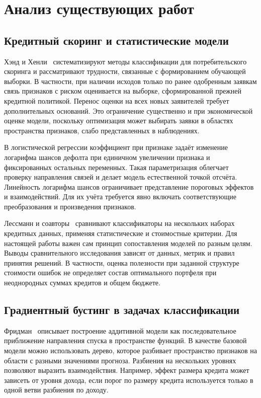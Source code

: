 \documentclass{misisarticle}
\begin{document}
\section{Анализ существующих работ}

\subsection{Кредитный скоринг и статистические модели}

Хэнд и Хенли~\cite{hand} систематизируют методы классификации для потребительского скоринга и рассматривают трудности, связанные с формированием обучающей выборки. В частности, при наличии исходов только по ранее одобренным заявкам связь признаков с риском оценивается на выборке, сформированной прежней кредитной политикой. Перенос оценки на всех новых заявителей требует дополнительных оснований. Это ограничение существенно и при экономической оценке модели, поскольку оптимизация может выбирать заявки в областях пространства признаков, слабо представленных в наблюдениях.

В логистической регрессии коэффициент при признаке задаёт изменение логарифма шансов дефолта при единичном увеличении признака и фиксированных остальных переменных. Такая параметризация облегчает проверку направления связей и делает модель естественной точкой отсчёта. Линейность логарифма шансов ограничивает представление пороговых эффектов и взаимодействий. Для их учёта требуется явно включать соответствующие преобразования и произведения признаков.

Лессманн и соавторы~\cite{lessmann} сравнивают классификаторы на нескольких наборах кредитных данных, применяя статистические и стоимостные критерии. Для настоящей работы важен сам принцип сопоставления моделей по разным целям. Выводы сравнительного исследования зависят от данных, метрик и правил принятия решений. В частности, оценка полезности при заданной структуре стоимости ошибок не определяет состав оптимального портфеля при неоднородных суммах кредитов и общем бюджете.

\subsection{Градиентный бустинг в задачах классификации}

Фридман~\cite{friedman} описывает построение аддитивной модели как последовательное приближение направления спуска в пространстве функций. В качестве базовой модели можно использовать дерево, которое разбивает пространство признаков на области с разными значениями прогноза. Разбиения на нескольких уровнях позволяют выразить взаимодействия. Например, эффект размера кредита может зависеть от уровня дохода, если порог по размеру кредита используется только в одной ветви разбиения по доходу.
\end{document}
